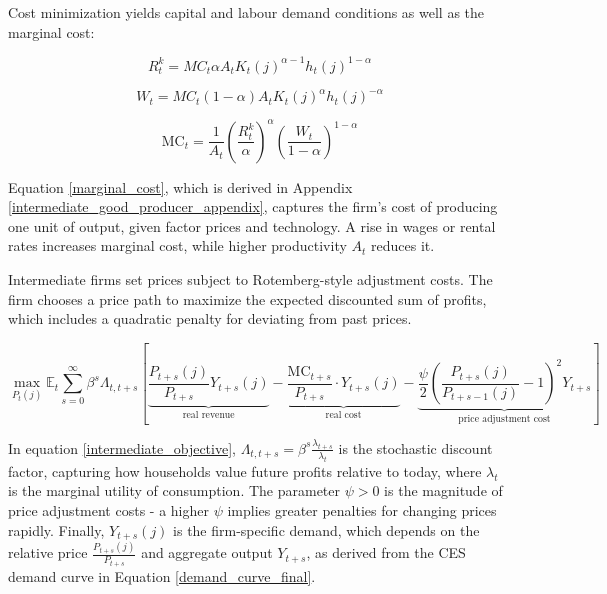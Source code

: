\documentclass[11pt,preprint]{elsarticle}
\numberwithin{equation}{section}
\numberwithin{figure}{section}
\numberwithin{table}{section}
\begin{document}
Cost minimization yields capital and labour demand conditions as well as
the marginal cost:

\begin{equation}
R_t^k = MC_t \alpha A_t K_t(j)^{\alpha-1} h_t(j)^{1-\alpha}
\label{Capital_Demand_Condition}
\end{equation}

\begin{equation}
W_t = MC_t (1-\alpha) A_t K_t(j)^{\alpha} h_t(j)^{-\alpha}
\label{Labour_Demand_Condition}
\end{equation}

\begin{equation}
\text{MC}_t = \frac{1}{A_t} \left( \frac{R_t^k}{\alpha} \right)^{\alpha} \left( \frac{W_t}{1-\alpha} \right)^{1-\alpha}
\label{marginal_cost}
\end{equation}

Equation \eqref{marginal_cost}, which is derived in Appendix
\ref{intermediate_good_producer_appendix}, captures the firm's cost of
producing one unit of output, given factor prices and technology. A rise
in wages or rental rates increases marginal cost, while higher
productivity \(A_t\) reduces it.

Intermediate firms set prices subject to Rotemberg-style adjustment
costs. The firm chooses a price path to maximize the expected discounted
sum of profits, which includes a quadratic penalty for deviating from
past prices.

\begin{equation}
\max_{P_t(j)} \mathbb{E}_t \sum_{s=0}^{\infty} \beta^s \Lambda_{t,t+s} \left[
\underbrace{\frac{P_{t+s}(j)}{P_{t+s}} Y_{t+s}(j)}_{\text{real revenue}} 
- \underbrace{\frac{\text{MC}_{t+s}}{P_{t+s}} \cdot Y_{t+s}(j)}_{\text{real cost}} 
- \underbrace{\frac{\psi}{2} \left( \frac{P_{t+s}(j)}{P_{t+s-1}(j)} - 1 \right)^2 Y_{t+s}}_{\text{price adjustment cost}}
\right]
\label{intermediate_objective}
\end{equation}

In equation \eqref{intermediate_objective},
\(\Lambda_{t,t+s} = \beta^s \frac{\lambda_{t+s}}{\lambda_t}\) is the
stochastic discount factor, capturing how households value future
profits relative to today, where \(\lambda_t\) is the marginal utility
of consumption. The parameter \(\psi > 0\) is the magnitude of price
adjustment costs - a higher \(\psi\) implies greater penalties for
changing prices rapidly. Finally, \(Y_{t+s}(j)\) is the firm-specific
demand, which depends on the relative price
\(\frac{P_{t+s}(j)}{P_{t+s}}\) and aggregate output \(Y_{t+s}\), as
derived from the CES demand curve in Equation
\eqref{demand_curve_final}.
\end{document}
